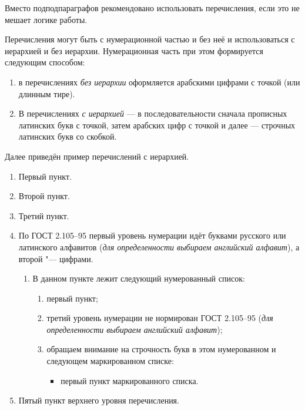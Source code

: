 Вместо подподпараграфов рекомендовано использовать перечисления, если это не мешает логике работы.

Перечисления могут быть с нумерационной частью и без неё и использоваться с иерархией и без иерархии. Нумерационная часть при этом формируется следующим способом:

\begin{enumerate}[1.]
	\item в перечислениях {\itshape без иерархии} оформляется арабскими цифрами с точкой (или длинным тире).
	\item В перечислениях {\itshape с иерархией} --- в последовательности сначала прописных латинских букв с точкой, затем арабских цифр с точкой и далее --- строчных латинских букв со скобкой.
\end{enumerate}





Далее приведён пример перечислений с иерархией.


\begin{enumerate}
	\item Первый пункт.
	\item Второй пункт.
	\item Третий пункт.
	\item По ГОСТ 2.105--95 \cite{gost-russian-text-documents} первый уровень нумерации идёт буквами русского или латинского алфавитов ({\itshape для определенности выбираем английский алфавит}),
	а второй "--- цифрами.
	\begin{enumerate}
		\item В данном пункте лежит следующий нумерованный список:
		\begin{enumerate}
			\item первый пункт;
			\item третий уровень нумерации не нормирован ГОСТ 2.105--95 ({\itshape для определенности выбираем английский алфавит});
			\item обращаем внимание на строчность букв в этом нумерованном и следующем маркированном списке:
			\begin{itemize}
				\item первый пункт маркированного списка.
			\end{itemize}
		\end{enumerate}
	\end{enumerate}
	\item Пятый пункт верхнего уровня перечисления.
\end{enumerate}

